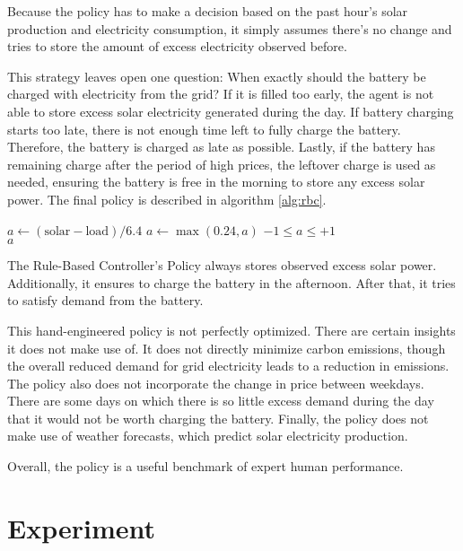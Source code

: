 Because the policy has to make a decision based on the past hour's solar production and electricity consumption, it simply assumes there's no change and tries to store the amount of excess electricity observed before.

This strategy leaves open one question:
When exactly should the battery be charged with electricity from the grid?
If it is filled too early, the agent is not able to store excess solar electricity generated during the day.
If battery charging starts too late, there is not enough time left to fully charge the battery. Therefore, the battery is charged as late as possible.
Lastly, if the battery has remaining charge after the period of high prices, the leftover charge is used as needed, ensuring the battery is free in the morning to store any excess solar power.
The final policy is described in algorithm \ref{alg:rbc}.

\begin{algorithm}[h]
    \begin{algorithmic}
        \State $a \gets (\text{solar} - \text{load})/6.4$ 
            \State $a \gets \max(0.24, a)$ 
        \EndIf
        \Ensure $-1 \leq a \leq +1$ \\
        \Return $a$
    \end{algorithmic}
    \caption{The Rule-Based Controller's Policy always stores observed excess solar power. Additionally, it ensures to charge the battery in the afternoon. After that, it tries to satisfy demand from the battery.}
    \label{alg:rbc}
\end{algorithm}

This hand-engineered policy is not perfectly optimized.
There are certain insights it does not make use of.
It does not directly minimize carbon emissions, though the overall reduced demand for grid electricity leads to a reduction in emissions.
The policy also does not incorporate the change in price between weekdays.
There are some days on which there is so little excess demand during the day that it would not be worth charging the battery.
Finally, the policy does not make use of weather forecasts, which predict solar electricity production.

Overall, the policy is a useful benchmark of expert human performance.


\section{Experiment} %


